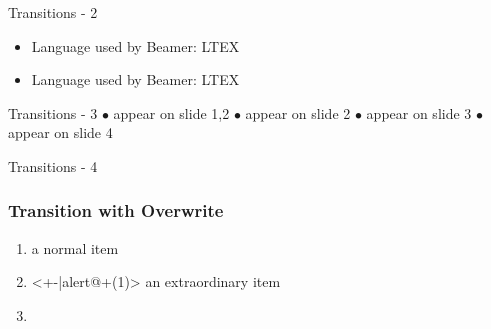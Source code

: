 \documentclass[pdf]{beamer}
\begin{document}
\begin{frame}{Transitions - 2}
  \begin{itemize}
    \item Language used by Beamer: LTEX
    \item Language used by Beamer: LTEX
  \end{itemize}
\end{frame}

\begin{frame}[t]{Transitions - 3}
   {{\small\color{blue}$\bullet$} appear on slide 1,2 \newline}
   {{\small\color{blue}$\bullet$} appear on slide 2 \newline}
   {{\small\color{blue}$\bullet$} appear on slide 3 \newline}
   {{\small\color{blue}$\bullet$} appear on slide 4 \newline}
\end{frame}

\begin{frame}{Transitions - 4}
  \frametitle{Transition with Overwrite}
  \begin{enumerate}
    \item<+-> {a normal item}
    \item<+-|alert@+(1)> {an extraordinary item}
    \item[]
  \end{enumerate}
\end{frame}
\end{document}
